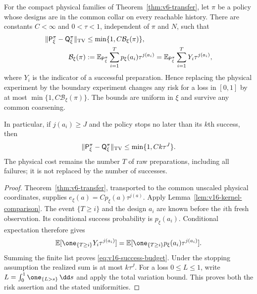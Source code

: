 \begin{theorem}
\label{thm:v16-adaptive-transfer}
For the compact physical families of Theorem~\ref{thm:v6-transfer},
let $\pi$ be a policy whose designs are in the common collar on every
reachable history. There are constants $C<\infty$ and $0<\tau<1$,
independent of $\pi$ and $N$, such that
\begin{align}
 \|\mathsf P_\xi^\pi-\mathsf Q_\xi^\pi\|_{\rm TV}
 &\le \min\{1,C\mathcal B_\xi(\pi)\},
                                      \label{eq:v16-adaptive-transfer}\\
 \mathcal B_\xi(\pi)
 &:=\mathbb E_{\mathsf P_\xi^\pi}
       \sum_{i=1}^{T}p_\xi(a_i)\tau^{j(a_i)}
   =\mathbb E_{\mathsf P_\xi^\pi}
       \sum_{i=1}^{T}Y_i\tau^{j(a_i)},
                                      \label{eq:v16-success-budget}
\end{align}
where $Y_i$ is the indicator of a successful preparation. Hence replacing
the physical experiment by the boundary experiment changes any risk for
a loss in $[0,1]$ by at most $\min\{1,C\mathcal B_\xi(\pi)\}$.
The bounds are uniform in $\xi$ and survive any common coarsening.

In particular, if $j(a_i)\ge J$ and the policy stops no later than
its $k$th success, then
\begin{equation}\label{eq:v16-success-stop}
 \|\mathsf P_\xi^\pi-\mathsf Q_\xi^\pi\|_{\rm TV}
                         \le\min\{1,Ck\tau^J\}.
\end{equation}
The physical cost remains the number $T$ of raw preparations, including
all failures; it is not replaced by the number of successes.
\end{theorem}
\begin{proof}
Theorem~\ref{thm:v6-transfer}, transported to the common unscaled
physical coordinates, supplies
$e_\xi(a)=Cp_\xi(a)\tau^{j(a)}$. Apply
Lemma~\ref{lem:v16-kernel-comparison}. The event $\{T\ge i\}$ and
the design $a_i$ are known before the $i$th fresh observation. Its
conditional success probability is $p_\xi(a_i)$. Conditional expectation
therefore gives
\[
 \mathbb E[\one_{\{T\ge i\}}Y_i\tau^{j(a_i)}]
 =\mathbb E[\one_{\{T\ge i\}}p_\xi(a_i)\tau^{j(a_i)}].
\]
Summing the finite list proves \eqref{eq:v16-success-budget}. Under
the stopping assumption the realized sum is at most $k\tau^J$.
For a loss $0\le L\le1$, write
$L=\int_0^1\one_{\{L>s\}}\,\dd s$ and apply the total variation
bound. This proves both the risk assertion and the stated uniformities.
\end{proof}

